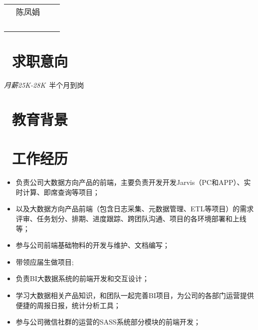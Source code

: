 \documentclass{resume}
\begin{document}

\Large{
  \begin{tabu}{ l l r r }
    & \scshape{陈凤娟} &      & \\
    &  &      &  \\
    &  &      &  \\
    &  &      &  \\
    &  &      & 
  \end{tabu}
}

\normalsize
\section{\faInfo\  求职意向}
\textit{月薪25K-28K}\ 半个月到岗

\section{\faGraduationCap\  教育背景}

\section{\faGraduationCap\  工作经历}

\begin{onehalfspacing}
\begin{itemize}
  \item 负责公司大数据方向产品的前端，主要负责开发开发Jarvis（PC和APP）、实时计算、即席查询等项目；
  \item 以及大数据方向产品前端（包含日志采集、元数据管理、ETL等项目）的需求评审、任务划分、排期、进度跟踪、跨团队沟通、项目的各环境部署和上线等；
  \item 参与公司前端基础物料的开发与维护、文档编写；
  \item 带领应届生做项目;
\end{itemize}
\end{onehalfspacing}

\begin{onehalfspacing}
\begin{itemize}
  \item 负责BI大数据系统的前端开发和交互设计；
  \item 学习大数据相关产品知识，和团队一起完善BI项目，为公司的各部门运营提供便捷的周报日报，统计分析工具；
  \item 参与公司微信社群的运营的SASS系统部分模块的前端开发；
\end{itemize}
\end{onehalfspacing}
\end{document}
